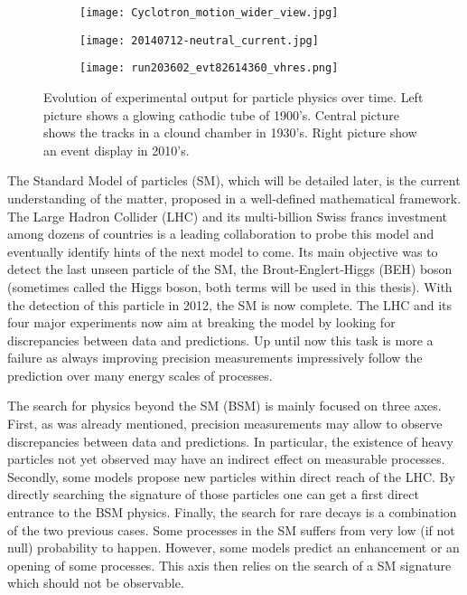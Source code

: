 \begin{figure}
\begin{subfigure}[t]{0.32\linewidth}
\begin{center}
\texttt{[image: Cyclotron\_motion\_wider\_view.jpg]}
\end{center}
\end{subfigure}
\begin{subfigure}[t]{0.32\linewidth}
\begin{center}
\texttt{[image: 20140712-neutral\_current.jpg]}
\end{center}
\end{subfigure}
\begin{subfigure}[t]{0.32\linewidth}
\begin{center}
\texttt{[image: run203602\_evt82614360\_vhres.png]}
\end{center}
\end{subfigure}
\caption{\label{org9494af2}
Evolution of experimental output for particle physics over time. Left picture shows a glowing cathodic tube of 1900's. Central picture shows the tracks in a clound chamber in 1930's. Right picture show an event display in 2010's.}
\end{figure}


The Standard Model of particles (SM), which will be detailed later, is the current understanding of the matter, proposed in a well-defined mathematical framework.
The Large Hadron Collider (LHC) and its multi-billion Swiss francs investment among dozens of countries is a leading collaboration to probe this model and eventually identify hints of the next model to come.
Its main objective was to detect the last unseen particle of the SM, the Brout-Englert-Higgs (BEH) boson (sometimes called the Higgs boson, both terms will be used in this thesis).
With the detection of this particle in 2012, the SM is now complete.
The LHC and its four major experiments now aim at breaking the model by looking for discrepancies between data and predictions.
Up until now this task is more a failure as always improving precision measurements impressively follow the prediction over many energy scales of processes.


The search for physics beyond the SM (BSM) is mainly focused on three axes.
First, as was already mentioned, precision measurements may allow to observe discrepancies between data and predictions.
In particular, the existence of heavy particles not yet observed may have an indirect effect on measurable processes.
Secondly, some models propose new particles within direct reach of the LHC.
By directly searching the signature of those particles one can get a first direct entrance to the BSM physics.
Finally, the search for rare decays is a combination of the two previous cases.
Some processes in the SM suffers from very low (if not null) probability to happen.
However, some models predict an enhancement or an opening of some processes.
This axis then relies on the search of a SM signature which should not be observable.

